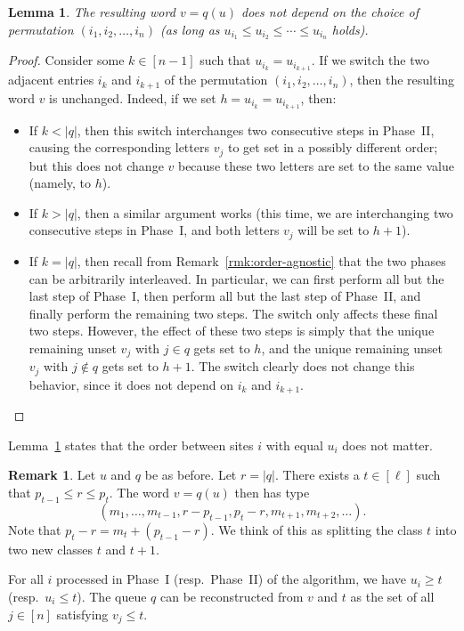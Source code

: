 \documentclass[reqno]{amsart}
\newcommand{\0}{\phantom{c}}
\newcommand{\abs}[1]{\left| #1 \right|}
\newcommand{\tup}[1]{\left( #1 \right)}
\newcommand{\ive}[1]{\left[ #1 \right]}
\theoremstyle{plain}
\newtheorem{lemma}[thm]{Lemma}
\theoremstyle{definition}
\newtheorem{remark}[thm]{Remark}
\numberwithin{equation}{section}
\begin{document}
\begin{lemma}
\label{lemma:order_indep}
The resulting word $v = q(u)$ does not depend on the choice of permutation $(i_1, i_2, \dotsc, i_n)$
(as long as $u_{i_1} \leq u_{i_2} \leq \cdots \leq u_{i_n}$ holds).
\end{lemma}

\begin{proof}
Consider some $k \in \ive{n-1}$ such that $u_{i_k} = u_{i_{k+1}}$.
If we switch the two adjacent entries $i_k$ and $i_{k+1}$ of the
permutation $\tup{i_1, i_2, \ldots, i_n}$,
then the resulting word $v$ is unchanged.
Indeed, if we set $h = u_{i_k} = u_{i_{k+1}}$, then:
\begin{itemize}
 \item If $k < \abs{q}$, then this switch interchanges two consecutive
       steps in Phase~II, causing the corresponding letters $v_j$ to
       get set in a possibly different order; but this does not change $v$
       because these two letters are set to the same value
       (namely, to $h$).
 \item If $k > \abs{q}$, then a similar argument works (this time, we
       are interchanging two consecutive steps in Phase~I, and both
       letters $v_j$ will be set to $h+1$).
 \item If $k = \abs{q}$, then recall from Remark~\ref{rmk:order-agnostic} that
       the two phases can be arbitrarily interleaved.
       In particular, we can first perform all but the last step of Phase~I,
       then perform all but the last step of Phase~II,
       and finally perform the remaining two steps.
       The switch only affects these final two steps.
       However, the effect of these two steps is simply that the unique
       remaining unset $v_j$ with $j \in q$ gets set to $h$,
       and the unique remaining unset $v_j$ with $j \notin q$ gets set to $h+1$.
       The switch clearly does not change this behavior,
       since it does not depend on $i_k$ and $i_{k+1}$.
\end{itemize}
\end{proof}

Lemma~\ref{lemma:order_indep} states that the order between sites $i$ with equal $u_i$ does not matter.

\begin{remark}
\label{rmk:t-splitting}
Let $u$ and $q$ be as before. Let $r = \abs{q}$.
There exists a $t \in \ive{\ell}$ such that
$
p_{t-1} \leq r \leq p_t.
$
The word $v = q(u)$ then has type
\begin{equation}
\label{eq:queue_type_change}
(m_1, \dots, m_{t-1}, r-p_{t-1}, p_{t}-r, m_{t+1}, m_{t+2}, \ldots).
\end{equation}
Note that $p_{t} - r = m_{t} + (p_{t-1} - r)$.
We think of this as splitting the class $t$ into two new classes $t$ and $t+1$.

For all $i$ processed in Phase~I (resp.\ Phase~II) of the algorithm, we have $u_i \geq t$ (resp.~$u_i \leq t$).
The queue $q$ can be reconstructed from $v$ and $t$ as the set of all $j \in \ive{n}$ satisfying $v_j \leq t$.
\end{remark}
\end{document}
